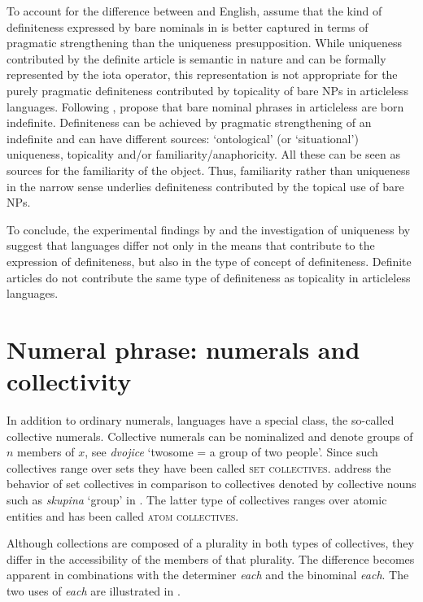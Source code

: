\documentclass[output=paper]{langscibook}
\begin{document}
\noindent To account for the difference between  and English, \citeauthor{Seres.Borik2021} assume that the kind of definiteness expressed by bare nominals in  is better captured in terms of pragmatic strengthening than the uniqueness presupposition. While uniqueness contributed by the definite article is semantic in nature and can be formally represented by the iota operator, this representation is not appropriate for the purely pragmatic definiteness contributed by topicality of bare NPs in articleless languages. Following \citet{Heim2011}, \citeauthor{Seres.Borik2021} propose that bare nominal phrases in articleless  are born indefinite. Definiteness can be achieved by pragmatic strengthening of an indefinite and can have different sources: `ontological' (or `situational') uniqueness, topicality and/or familiarity/anaphoricity. All these can be seen as sources for the familiarity of the object. Thus, familiarity rather than uniqueness in the narrow sense underlies definiteness contributed by the topical use of bare NPs.

To conclude, the experimental findings by \citet{Simik.Demian2020} and the investigation of uniqueness by \citeauthor{Seres.Borik2021} suggest that languages differ not only in the means that contribute to the expression of definiteness, but also in the type of concept of definiteness. Definite articles do not contribute the same type of definiteness as topicality in articleless languages.
\section{Numeral phrase: numerals and collectivity}

In addition to ordinary numerals,  languages have a special class, the so-called collective numerals. Collective numerals can be nominalized and denote groups of $n$ members of $x$, see  \textit{dvojice} `twosome = a group of two people'. Since such collectives range over sets they have been called \textsc{set collectives}.  address the behavior of set collectives in comparison to collectives denoted by collective nouns such as \textit{skupina} `group' in . The latter type of collectives ranges over atomic entities and has been called \textsc{atom collectives}.

Although collections are composed of a plurality in both types of collectives, they differ in the accessibility of the members of that plurality. The difference becomes apparent in combinations with the determiner \textit{each} and the binominal \textit{each}. The two uses of \textit{each} are illustrated in .
\end{document}
